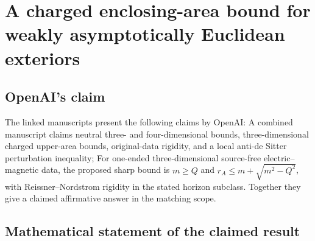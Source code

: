 \documentclass[11pt]{article}
\begin{document}
\section*{A charged enclosing-area bound for weakly asymptotically Euclidean exteriors}

\subsection{OpenAI's claim}
The linked manuscripts present the following claims by OpenAI: A combined manuscript claims neutral three- and four-dimensional bounds, three-dimensional charged upper-area bounds, original-data rigidity, and a local anti-de Sitter perturbation inequality; For one-ended three-dimensional source-free electric--magnetic data, the proposed sharp bound is $m\geq Q$ and $r_A\leq m+\sqrt{m^2-Q^2}$, with Reissner--Nordstrom rigidity in the stated horizon subclass. Together they give a claimed affirmative answer in the matching scope.

\subsection{Mathematical statement of the claimed result}
\end{document}
